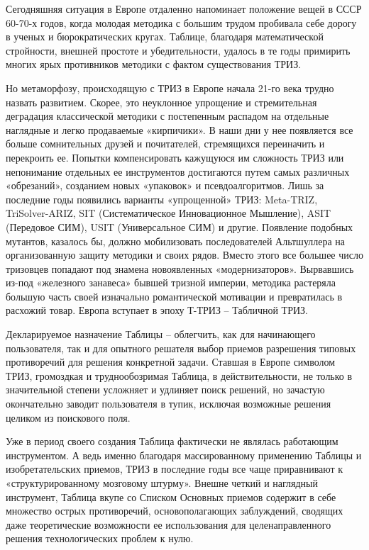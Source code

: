 \documentclass[11pt,a4paper]{article}
\begin{document}
Сегодняшняя ситуация в Европе отдаленно напоминает положение вещей в СССР
60-70-х годов, когда молодая методика с большим трудом пробивала себе дорогу в
ученых и бюрократических кругах. Таблице, благодаря математической стройности,
внешней простоте и убедительности, удалось в те годы примирить многих ярых
противников методики с фактом существования ТРИЗ.

Но метаморфозу, происходящую с ТРИЗ в Европе начала 21-го века трудно назвать
развитием. Скорее, это неуклонное упрощение и стремительная деградация
классической методики с постепенным распадом на отдельные наглядные и легко
продаваемые «кирпичики». В наши дни у нее появляется все больше сомнительных
друзей и почитателей, стремящихся переиначить и перекроить ее. Попытки
компенсировать кажущуюся им сложность ТРИЗ или непонимание отдельных ее
инструментов достигаются путем самых различных «обрезаний», созданием новых
«упаковок» и псевдоалгоритмов. Лишь за последние годы появились варианты
«упрощенной» ТРИЗ: Meta-TRIZ, TriSolver-ARIZ, SIT (Систематическое
Инновационное Мышление), ASIT (Передовое СИМ), USIT (Универсальное СИМ) и
другие. Появление подобных мутантов, казалось бы, должно мобилизовать
последователей Альтшуллера на организованную защиту методики и своих рядов.
Вместо этого все большее число тризовцев попадают под знамена новоявленных
«модернизаторов». Вырвавшись из-под «железного занавеса» бывшей тризной
империи, методика растеряла большую часть своей изначально романтической
мотивации и превратилась в расхожий товар. Европа вступает в эпоху Т-ТРИЗ --
Табличной ТРИЗ.

Декларируемое назначение Таблицы -- облегчить, как для начинающего
пользователя, так и для опытного решателя выбор приемов разрешения типовых
противоречий для решения конкретной задачи. Ставшая в Европе символом ТРИЗ,
громоздкая и труднообозримая Таблица, в действительности, не только в
значительной степени усложняет и удлиняет поиск решений, но зачастую
окончательно заводит пользователя в тупик, исключая возможные решения целиком
из поискового поля.

Уже в период своего создания Таблица фактически не являлась работающим
инструментом. А ведь именно благодаря массированному применению Таблицы и
изобретательских приемов, ТРИЗ в последние годы все чаще приравнивают к
«структурированному мозговому штурму». Внешне четкий и наглядный инструмент,
Таблица вкупе со Списком Основных приемов содержит в себе множество острых
противоречий, основополагающих заблуждений, сводящих даже теоретические
возможности ее использования для целенаправленного решения технологических
проблем к нулю.
\end{document}
